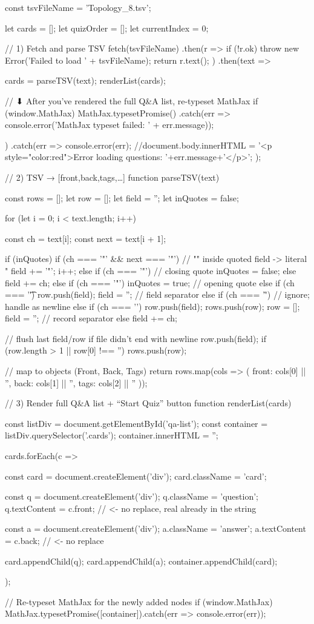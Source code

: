 \documentclass{tstextbook}
\begin{document}
    const tsvFileName = 'Topology_8.tsv';

    let cards = [];
    let quizOrder = [];
    let currentIndex = 0;

    // 1) Fetch and parse TSV
fetch(tsvFileName)
  .then(r => {
    if (!r.ok) throw new Error('Failed to load ' + tsvFileName);
    return r.text();
  })
  .then(text => {
    cards = parseTSV(text);
    renderList(cards);

    // ⬇ After you’ve rendered the full Q&A list, re-typeset MathJax
    if (window.MathJax) {
      MathJax.typesetPromise()
        .catch(err => console.error('MathJax typeset failed: ' + err.message));
    }
  })
  .catch(err => {
    console.error(err);
    //document.body.innerHTML =  '<p style="color:red">Error loading questions: '+err.message+'</p>';
  });

    // 2) TSV → [{front,back,tags},…]
    function parseTSV(text) {
  const rows = [];
  let row = [];
  let field = '';
  let inQuotes = false;

  for (let i = 0; i < text.length; i++) {
    const ch = text[i];
    const next = text[i + 1];

    if (inQuotes) {
      if (ch === '"' && next === '"') {
        // "" inside quoted field -> literal "
        field += '"';
        i++;
      } else if (ch === '"') {
        // closing quote
        inQuotes = false;
      } else {
        field += ch;
      }
    } else {
      if (ch === '"') {
        inQuotes = true;                // opening quote
      } else if (ch === '\t') {
        row.push(field); field = '';    // field separator
      } else if (ch === '\r') {
        // ignore; handle \n as newline
      } else if (ch === '\n') {
        row.push(field); rows.push(row);
        row = []; field = '';           // record separator
      } else {
        field += ch;
      }
    }
  }
  // flush last field/row if file didn't end with newline
  row.push(field);
  if (row.length > 1 || row[0] !== '') rows.push(row);

  // map to objects (Front, Back, Tags)
  return rows.map(cols => ({
    front: cols[0] || '',
    back:  cols[1] || '',
    tags:  cols[2] || ''
  }));
}
// 3) Render full Q&A list + “Start Quiz” button
function renderList(cards) {
  const listDiv = document.getElementById('qa-list');
  const container = listDiv.querySelector('.cards');
  container.innerHTML = '';

  cards.forEach(c => {
    const card = document.createElement('div');
    card.className = 'card';

    const q = document.createElement('div');
    q.className = 'question';
    q.textContent = c.front;   // <- no replace, real \n already in the string

    const a = document.createElement('div');
    a.className = 'answer';
    a.textContent = c.back;    // <- no replace

    card.appendChild(q);
    card.appendChild(a);
    container.appendChild(card);
  });

  // Re-typeset MathJax for the newly added nodes
  if (window.MathJax) {
    MathJax.typesetPromise([container]).catch(err => console.error(err));
  }
}
\end{document}
